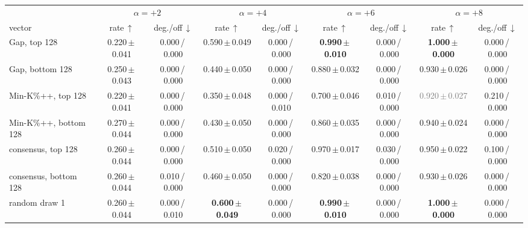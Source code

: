 \begin{tabular}{@{}lcccccccc@{}}
\toprule
& \multicolumn{2}{c}{$\alpha=+2$} & \multicolumn{2}{c}{$\alpha=+4$} & \multicolumn{2}{c}{$\alpha=+6$} & \multicolumn{2}{c}{$\alpha=+8$} \\
\cmidrule(lr){2-3}\cmidrule(lr){4-5}\cmidrule(lr){6-7}\cmidrule(lr){8-9}
vector & rate\,$\uparrow$ & deg./off\,$\downarrow$ & rate\,$\uparrow$ & deg./off\,$\downarrow$ & rate\,$\uparrow$ & deg./off\,$\downarrow$ & rate\,$\uparrow$ & deg./off\,$\downarrow$ \\
\midrule
Gap, top 128 & 0.220\,{\scriptsize$\pm$\,0.041} & {\scriptsize 0.000\,/\,0.000} & 0.590\,{\scriptsize$\pm$\,0.049} & {\scriptsize 0.000\,/\,0.000} & \textbf{0.990\,{\scriptsize$\pm$\,0.010}} & {\scriptsize 0.000\,/\,0.000} & \textbf{1.000\,{\scriptsize$\pm$\,0.000}} & {\scriptsize 0.000\,/\,0.000} \\
Gap, bottom 128 & 0.250\,{\scriptsize$\pm$\,0.043} & {\scriptsize 0.000\,/\,0.000} & 0.440\,{\scriptsize$\pm$\,0.050} & {\scriptsize 0.000\,/\,0.000} & 0.880\,{\scriptsize$\pm$\,0.032} & {\scriptsize 0.000\,/\,0.000} & 0.930\,{\scriptsize$\pm$\,0.026} & {\scriptsize 0.000\,/\,0.000} \\
Min-K\%++, top 128 & 0.220\,{\scriptsize$\pm$\,0.041} & {\scriptsize 0.000\,/\,0.000} & 0.350\,{\scriptsize$\pm$\,0.048} & {\scriptsize 0.000\,/\,0.010} & 0.700\,{\scriptsize$\pm$\,0.046} & {\scriptsize 0.010\,/\,0.000} & \textcolor{gray}{0.920\,{\scriptsize$\pm$\,0.027}} & {\scriptsize 0.210\,/\,0.000} \\
Min-K\%++, bottom 128 & 0.270\,{\scriptsize$\pm$\,0.044} & {\scriptsize 0.000\,/\,0.000} & 0.430\,{\scriptsize$\pm$\,0.050} & {\scriptsize 0.000\,/\,0.000} & 0.860\,{\scriptsize$\pm$\,0.035} & {\scriptsize 0.000\,/\,0.000} & 0.940\,{\scriptsize$\pm$\,0.024} & {\scriptsize 0.000\,/\,0.000} \\
consensus, top 128 & 0.260\,{\scriptsize$\pm$\,0.044} & {\scriptsize 0.000\,/\,0.000} & 0.510\,{\scriptsize$\pm$\,0.050} & {\scriptsize 0.020\,/\,0.000} & 0.970\,{\scriptsize$\pm$\,0.017} & {\scriptsize 0.030\,/\,0.000} & 0.950\,{\scriptsize$\pm$\,0.022} & {\scriptsize 0.100\,/\,0.000} \\
consensus, bottom 128 & 0.260\,{\scriptsize$\pm$\,0.044} & {\scriptsize 0.010\,/\,0.000} & 0.460\,{\scriptsize$\pm$\,0.050} & {\scriptsize 0.000\,/\,0.000} & 0.820\,{\scriptsize$\pm$\,0.038} & {\scriptsize 0.000\,/\,0.000} & 0.930\,{\scriptsize$\pm$\,0.026} & {\scriptsize 0.000\,/\,0.000} \\
\midrule
random draw 1 & 0.260\,{\scriptsize$\pm$\,0.044} & {\scriptsize 0.000\,/\,0.010} & \textbf{0.600\,{\scriptsize$\pm$\,0.049}} & {\scriptsize 0.000\,/\,0.000} & \textbf{0.990\,{\scriptsize$\pm$\,0.010}} & {\scriptsize 0.000\,/\,0.000} & \textbf{1.000\,{\scriptsize$\pm$\,0.000}} & {\scriptsize 0.000\,/\,0.000} \\

\end{tabular}
